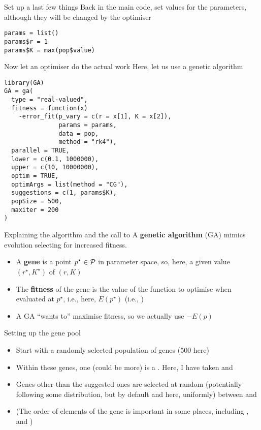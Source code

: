 \documentclass[aspectratio=43]{beamer}
\begin{document}
\begin{frame}[fragile]{Set up a last few things}
Back in the main code, set values for the parameters, although they will be changed by the optimiser
\begin{lstlisting}
params = list()
params$r = 1
params$K = max(pop$value)
\end{lstlisting}
\end{frame}

\begin{frame}[fragile]{Now let an optimiser do the actual work}
Here, let us use a genetic algorithm
\begin{lstlisting}
library(GA)
GA = ga(
  type = "real-valued",
  fitness = function(x) 
    -error_fit(p_vary = c(r = x[1], K = x[2]),
               params = params,
               data = pop,
               method = "rk4"),
  parallel = TRUE,
  lower = c(0.1, 1000000),
  upper = c(10, 10000000),
  optim = TRUE,
  optimArgs = list(method = "CG"),
  suggestions = c(1, params$K),
  popSize = 500,
  maxiter = 200
)
\end{lstlisting}
\end{frame}

\begin{frame}{Explaining the algorithm and the call to }
    A \textbf{genetic algorithm} (GA) mimics evolution selecting for increased fitness.
    \vfill
    \begin{itemize}
        \item A \textbf{gene} is a point $p^\star\in\P$ in parameter space, so, here, a given value $(r^\star,K^\star)$ of $(r,K)$
        \item The \textbf{fitness} of the gene is the value of the function to optimise when evaluated at $p^\star$, i.e., here, $E(p^\star)$ (i.e., )
        \item A GA ``wants to'' maximise fitness, so we actually use $-E(p)$
    \end{itemize}
\end{frame}

\begin{frame}{Setting up the gene pool}
    \begin{itemize}
        \item Start with a randomly selected population of  genes (500 here)
        \item Within these  genes, one (could be more) is a . Here, I have taken  and 
        \item Genes other than the suggested ones are selected at random (potentially following some distribution, but by default and here, uniformly) between  and 
        \item  (The order of elements of the gene is important in some places, including ,  and )
    \end{itemize}
\end{frame}
\end{document}
